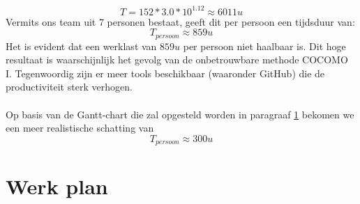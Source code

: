 \begin{equation*}
	T = 152*3.0*10^{1.12} \approx 6011u 
\end{equation*}
Vermits ons team uit 7 personen bestaat, geeft dit per persoon een tijdsduur van:
\begin{equation*}
	T_{persoon} \approx 859u
\end{equation*}
Het is evident dat een werklast van $859u$ per persoon niet haalbaar is. Dit hoge resultaat is waarschijnlijk het gevolg van de onbetrouwbare methode COCOMO I. Tegenwoordig zijn er meer tools beschikbaar (waaronder GitHub) die de productiviteit sterk verhogen. 
\\
\\
Op basis van de Gantt-chart die zal opgesteld worden in paragraaf \ref{sec:workplan} bekomen we een meer realistische schatting van 
\begin{equation*}
	T_{persoon} \approx 300u
\end{equation*}
\section{Werk plan} \label{sec:workplan}
